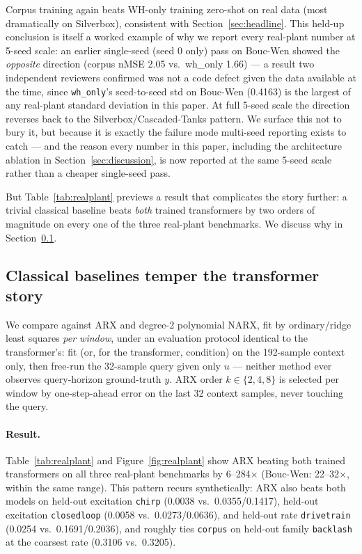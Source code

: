 \documentclass{article}
\begin{document}
Corpus training again beats WH-only training zero-shot on real data (most
dramatically on Silverbox), consistent with Section~\ref{sec:headline}. This
held-up conclusion is itself a worked example of why we report every real-plant
number at 5-seed scale: an earlier single-seed (seed 0 only) pass on Bouc-Wen
showed the \emph{opposite} direction (corpus nMSE 2.05 vs.\ wh\_only 1.66) ---
a result two independent reviewers confirmed was not a code defect given the
data available at the time, since \texttt{wh\_only}'s seed-to-seed std on
Bouc-Wen (0.4163) is the largest of any real-plant standard deviation in
this paper. At full 5-seed scale the direction reverses back to the
Silverbox/Cascaded-Tanks pattern. We surface this not to bury it, but because
it is exactly the failure mode multi-seed reporting exists to catch --- and
the reason every number in this paper, including the architecture ablation in
Section~\ref{sec:discussion}, is now reported at the same 5-seed scale rather
than a cheaper single-seed pass.

But Table~\ref{tab:realplant} previews a result that complicates the story
further: a trivial classical baseline beats \emph{both} trained transformers
by two orders of magnitude on every one of the three real-plant benchmarks. We
discuss why in Section~\ref{sec:baselines}.

\subsection{Classical baselines temper the transformer story}
\label{sec:baselines}

We compare against ARX and degree-2 polynomial NARX, fit by ordinary/ridge
least squares \emph{per window}, under an evaluation protocol identical to the
transformer's: fit (or, for the transformer, condition) on the 192-sample
context only, then free-run the 32-sample query given only $u$ --- neither
method ever observes query-horizon ground-truth $y$. ARX order
$k\in\{2,4,8\}$ is selected per window by one-step-ahead error on the last 32
context samples, never touching the query.

\paragraph{Result.} Table~\ref{tab:realplant} and Figure~\ref{fig:realplant}
show ARX beating both trained transformers on all three real-plant benchmarks
by 6--284$\times$ (Bouc-Wen: 22--32$\times$, within the same range). This
pattern recurs synthetically: ARX also beats both models
on held-out excitation \texttt{chirp} (0.0038 vs.\ 0.0355/0.1417), held-out
excitation \texttt{closedloop} (0.0058 vs.\ 0.0273/0.0636), and held-out rate
\texttt{drivetrain} (0.0254 vs.\ 0.1691/0.2036), and roughly ties \texttt{corpus}
on held-out family \texttt{backlash} at the coarsest rate (0.3106 vs.\ 0.3205).
\end{document}
